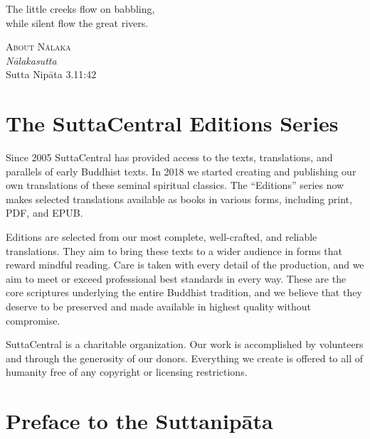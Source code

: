 \documentclass[12pt,openany]{book}%
\newcommand{\blankpage}{
\newpage
\thispagestyle{empty}
\mbox{}
\newpage
}
\newcommand*{\epigraphTranslatedTitle}[1]{\vspace*{.5em}\footnotesize\textsc{#1}\\}%
\newcommand*{\epigraphRootTitle}[1]{\footnotesize\textit{#1}\\}%
\newcommand*{\epigraphReference}[1]{\footnotesize{#1}}%
\begin{document}
\newpage

\setlength{\parindent}{1.5em}%
\newpage

\vspace*{\fill}

\begin{center}
\epigraph{The little creeks flow on babbling,\\
while silent flow the great rivers.}
{
\epigraphTranslatedTitle{About \textsanskrit{Nālaka}}
\epigraphRootTitle{\textsanskrit{Nālakasutta}}
\epigraphReference{Sutta \textsanskrit{Nipāta} 3.11:42}
}
\end{center}

\vspace*{2in}

\vspace*{\fill}

\blankpage%

\setlength{\parindent}{1em}
%
\tableofcontents
\newpage
\pagestyle{fancy}
%
\chapter*{The SuttaCentral Editions Series}

Since 2005 SuttaCentral has provided access to the texts, translations, and parallels of early Buddhist texts. In 2018 we started creating and publishing our own translations of these seminal spiritual classics. The “Editions” series now makes selected translations available as books in various forms, including print, PDF, and EPUB.

Editions are selected from our most complete, well-crafted, and reliable translations. They aim to bring these texts to a wider audience in forms that reward mindful reading. Care is taken with every detail of the production, and we aim to meet or exceed professional best standards in every way. These are the core scriptures underlying the entire Buddhist tradition, and we believe that they deserve to be preserved and made available in highest quality without compromise.

SuttaCentral is a charitable organization. Our work is accomplished by volunteers and through the generosity of our donors. Everything we create is offered to all of humanity free of any copyright or licensing restrictions. 

%
\chapter*{Preface to the \textsanskrit{Suttanipāta}}
\end{document}
